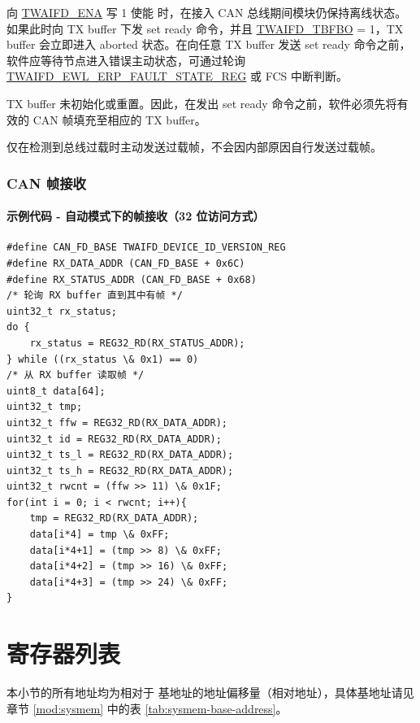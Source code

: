 \documentclass[main\_\_CN.tex]{subfiles}
\begin{document}
向 \hyperref[fielddesc:TWAIFDENA]{TWAIFD\_ENA} 写 1 使能 \modulename{} 时，在接入 CAN 总线期间模块仍保持离线状态。如果此时向 TX buffer 下发 set ready 命令，并且 \hyperref[fielddesc:TWAIFDTBFBO]{TWAIFD\_TBFBO} = 1，TX buffer 会立即进入 aborted 状态。在向任意 TX buffer 发送 set ready 命令之前，软件应等待节点进入错误主动状态，可通过轮询 \hyperref[regdesc:TWAIFDEWLERPFAULTSTATEREG]{TWAIFD\_EWL\_ERP\_FAULT\_STATE\_REG} 或 FCS 中断判断。

TX buffer 未初始化或重置。因此，在发出 set ready 命令之前，软件必须先将有效的 CAN 帧填充至相应的 TX buffer。

\modulename{} 仅在检测到总线过载时主动发送过载帧，不会因内部原因自行发送过载帧。


\subsubsection{CAN 帧接收}\label{sec:twai-prog-can-frame-recep}

\paragraph{示例代码 - 自动模式下的帧接收（32 位访问方式）}
\begin{lstlisting}
#define CAN_FD_BASE TWAIFD_DEVICE_ID_VERSION_REG
#define RX_DATA_ADDR (CAN_FD_BASE + 0x6C)
#define RX_STATUS_ADDR (CAN_FD_BASE + 0x68)
/* 轮询 RX buffer 直到其中有帧 */
uint32_t rx_status;
do {
    rx_status = REG32_RD(RX_STATUS_ADDR);
} while ((rx_status \& 0x1) == 0)
/* 从 RX buffer 读取帧 */
uint8_t data[64];
uint32_t tmp;
uint32_t ffw = REG32_RD(RX_DATA_ADDR);
uint32_t id = REG32_RD(RX_DATA_ADDR);
uint32_t ts_l = REG32_RD(RX_DATA_ADDR);
uint32_t ts_h = REG32_RD(RX_DATA_ADDR);
uint32_t rwcnt = (ffw >> 11) \& 0x1F;
for(int i = 0; i < rwcnt; i++){
    tmp = REG32_RD(RX_DATA_ADDR);
    data[i*4] = tmp \& 0xFF;
    data[i*4+1] = (tmp >> 8) \& 0xFF;
    data[i*4+2] = (tmp >> 16) \& 0xFF;
    data[i*4+3] = (tmp >> 24) \& 0xFF;
}
\end{lstlisting}





\newpage
\hypertarget{twai-reg-summ}{}
\section{寄存器列表}
\label{sec:twai-reg-summ}

本小节的所有地址均为相对于 \modulename{} 基地址的地址偏移量（相对地址），具体基地址请见章节 \ref{mod:sysmem} \textit{} 中的表 \ref{tab:sysmem-base-address}。
\end{document}
